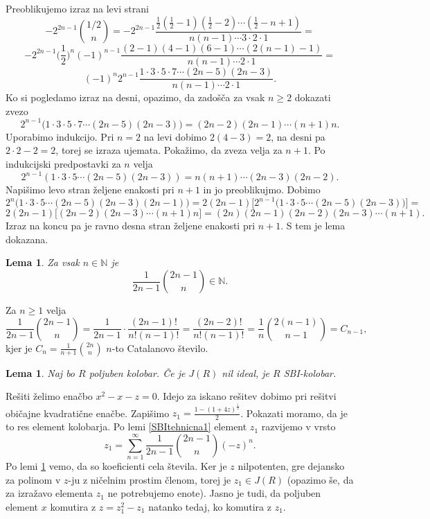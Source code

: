 \documentclass[a4paper, 12pt]{amsart}
\theoremstyle{definition} %
\theoremstyle{plain} %
\newtheorem{lema}[definicija]{Lema}
\newcommand{\N}{\mathbb N}
\begin{document}
Preoblikujemo izraz na levi strani
$$
-2^{2n-1} {1/2 \choose n} = -2^{2n-1} \frac{\frac{1}{2}(\frac{1}{2}-1)(\frac{1}{2} - 2)\cdots(\frac{1}{2} - n+1) }{n(n-1)\cdots 3 \cdot 2 \cdot 1} =
$$
$$
-2^{2n-1}\big(\frac{1}{2}\big)^n (-1)^{n-1} \frac{(2-1)(4-1)(6-1)\cdots (2(n-1)-1)}{n(n-1)\cdots 2 \cdot1} = 
$$
$$
(-1)^n 2^{n-1} \frac{1\cdot 3 \cdot 5 \cdot 7 \cdots (2n-5)(2n-3)}{n(n-1)\cdots 2\cdot1}.
$$
Ko si pogledamo izraz na desni, opazimo, da zadošča za vsak $n\ge 2$ dokazati zvezo
$$
2^{n-1}\big( 1\cdot 3 \cdot 5 \cdot 7 \cdots(2n-5)(2n-3)   \big) = (2n-2) (2n-1) \cdots (n+1) n.
$$
Uporabimo indukcijo. Pri $n=2$ na levi dobimo $2(4-3) = 2$, na desni pa $2\cdot 2 - 2 = 2$, torej se izraza ujemata. Pokažimo, da zveza velja za $n+1$. Po indukcijski predpostavki za $n$ velja 
$$
2^{n-1} (1\cdot 3\cdot 5 \cdots (2n-5)(2n-3)) = n(n+1)\cdots (2n-3)(2n-2).
$$
Napišimo levo stran željene enakosti pri $n+1$ in jo preoblikujmo. Dobimo
$$
2^n \big(1\cdot 3 \cdot 5 \cdots (2n-5)(2n-3)(2n-1)\big) = 2(2n-1) \big[2^{n-1}\big(1\cdot 3 \cdot 5 \cdots (2n-5)(2n-3) \big)\big]=
$$
$$
2(2n-1) \big[(2n-2)(2n-3)\cdots(n+1)n\big] = (2n)(2n-1)(2n-2)(2n-3)\cdots (n+1).
$$
Izraz na koncu pa je ravno desna stran željene enakosti pri $n+1$. S tem je lema dokazana.
\endproof

\begin{lema}
\label{SBItehnicna2}
Za vsak $n\in \N$ je 
$$
\frac{1}{2n-1} {2n-1 \choose n} \in \N.
$$
\end{lema}

\proof
Za $n\ge 1$ velja 
$$
\frac{1}{2n-1} {2n-1 \choose n} = \frac{1}{2n-1}\cdot\frac{(2n-1)!}{n! (n-1)!} = \frac{(2n-2)!}{n!(n-1)!} = \frac{1}{n} {2(n-1) \choose n-1} = C_{n-1},
$$
kjer je $C_n = \frac{1}{n+1}{2n \choose n}$ $n$-to Catalanovo število. 
\endproof

\begin{lema}
\label{nilJeSBI}
Naj bo $R$ poljuben kolobar. Če je $J(R)$ nil ideal, je $R$ SBI-kolobar.
\end{lema}

\proof
Rešiti želimo enačbo $x^2 - x - z = 0$. Idejo za iskano rešitev dobimo pri rešitvi običajne kvadratične enačbe. Zapišimo $z_1 = \frac{1-(1+4z)^{\frac{1}{2}}}{2}$. Pokazati moramo, da je to res element kolobarja. Po lemi \ref{SBItehnicna1} element $z_1$ razvijemo v vrsto
$$
z_1 = \sum_{n=1}^{\infty} \frac{1}{2n-1} \binom{2n-1}{n}(-z)^n.
$$
Po lemi \ref{SBItehnicna2} vemo, da so koeficienti cela števila. Ker je $z$ nilpotenten, gre dejansko za polinom v $z$-ju z ničelnim prostim členom, torej je $z_1 \in J(R)$ (opazimo še, da za izražavo elementa $z_1$ ne potrebujemo enote). Jasno je tudi, da poljuben element $x$ komutira z $z=z_1^2 - z_1$ natanko tedaj, ko komutira z $z_1$.
\endproof
\end{document}
